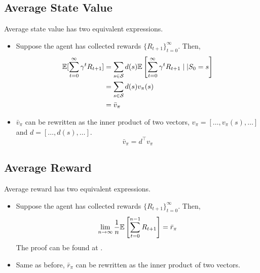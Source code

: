     \subsection{Average State Value}
        Average state value has two equivalent expressions.
        \begin{itemize}
            \item Suppose the agent has collected rewards $\{R_{t+1}\}_{t=0}^\infty$. Then,
            \begin{align}
                \mathbb{E}[\sum_{t=0}^\infty \gamma^t R_{t+1}] &= \sum_{s \in \mathcal{S}}d(s)\mathbb{E}\left[\sum_{t=0}^\infty \gamma^t R_{t+1} \mid| S_0 = s\right] \\
                                                       &= \sum_{s \in \mathcal{S}}d(s)v_\pi(s) \\
                                                       &= \bar{v}_\pi
            \end{align}
            \item $\bar{v}_\pi$ can be rewritten as the inner product of two vectors, $v_\pi = [\dots,v_\pi(s),\dots]$ and $d = [\dots,d(s),\dots]$.
                \begin{equation}
                    \bar{v}_\pi = d^\top v_\pi
                \end{equation}
        \end{itemize}

    \subsection{Average Reward}
        Average reward has two equivalent expressions.
        \begin{itemize}
            \item Suppose the agent has collected rewards $\{R_{t+1}\}_{t=0}^\infty$. Then,
                \begin{equation}
                    \lim_{n \to \infty}\frac{1}{n}\mathbb{E}\left[ \sum_{t=0}^{n-1}R_{t+1} \right] = \bar{r}_\pi
                \end{equation}
                The proof can be found at \cite{Zhao2025}.
            \item Same as before, $\bar{r}_\pi$ can be rewritten as the inner product of two vectors.
        \end{itemize}

